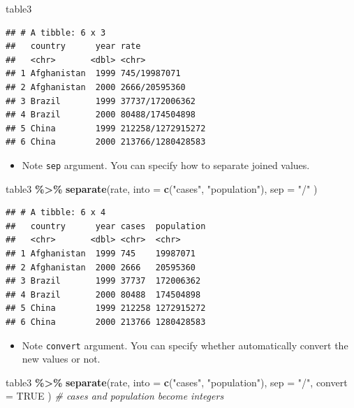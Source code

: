 \documentclass[
]{book}
\newenvironment{Shaded}{\begin{snugshade}}{\end{snugshade}}
\newcommand{\AttributeTok}[1]{\textcolor[rgb]{0.13,0.29,0.53}{#1}}
\newcommand{\CommentTok}[1]{\textcolor[rgb]{0.56,0.35,0.01}{\textit{#1}}}
\newcommand{\ConstantTok}[1]{\textcolor[rgb]{0.56,0.35,0.01}{#1}}
\newcommand{\FunctionTok}[1]{\textcolor[rgb]{0.13,0.29,0.53}{\textbf{#1}}}
\newcommand{\NormalTok}[1]{#1}
\newcommand{\SpecialCharTok}[1]{\textcolor[rgb]{0.81,0.36,0.00}{\textbf{#1}}}
\newcommand{\StringTok}[1]{\textcolor[rgb]{0.31,0.60,0.02}{#1}}
\providecommand{\tightlist}{%
  \setlength{\itemsep}{0pt}\setlength{\parskip}{0pt}}
\begin{document}
\begin{Shaded}
\begin{Highlighting}[]
\NormalTok{table3}
\end{Highlighting}
\end{Shaded}

\begin{verbatim}
## # A tibble: 6 x 3
##   country      year rate             
##   <chr>       <dbl> <chr>            
## 1 Afghanistan  1999 745/19987071     
## 2 Afghanistan  2000 2666/20595360    
## 3 Brazil       1999 37737/172006362  
## 4 Brazil       2000 80488/174504898  
## 5 China        1999 212258/1272915272
## 6 China        2000 213766/1280428583
\end{verbatim}

\begin{itemize}
\tightlist
\item
  Note \texttt{sep} argument. You can specify how to separate joined values.
\end{itemize}

\begin{Shaded}
\begin{Highlighting}[]
\NormalTok{table3 }\SpecialCharTok{\%\textgreater{}\%}
  \FunctionTok{separate}\NormalTok{(rate,}
    \AttributeTok{into =} \FunctionTok{c}\NormalTok{(}\StringTok{"cases"}\NormalTok{, }\StringTok{"population"}\NormalTok{),}
    \AttributeTok{sep =} \StringTok{"/"}
\NormalTok{  )}
\end{Highlighting}
\end{Shaded}

\begin{verbatim}
## # A tibble: 6 x 4
##   country      year cases  population
##   <chr>       <dbl> <chr>  <chr>     
## 1 Afghanistan  1999 745    19987071  
## 2 Afghanistan  2000 2666   20595360  
## 3 Brazil       1999 37737  172006362 
## 4 Brazil       2000 80488  174504898 
## 5 China        1999 212258 1272915272
## 6 China        2000 213766 1280428583
\end{verbatim}

\begin{itemize}
\tightlist
\item
  Note \texttt{convert} argument. You can specify whether automatically convert the new values or not.
\end{itemize}

\begin{Shaded}
\begin{Highlighting}[]
\NormalTok{table3 }\SpecialCharTok{\%\textgreater{}\%}
  \FunctionTok{separate}\NormalTok{(rate,}
    \AttributeTok{into =} \FunctionTok{c}\NormalTok{(}\StringTok{"cases"}\NormalTok{, }\StringTok{"population"}\NormalTok{),}
    \AttributeTok{sep =} \StringTok{"/"}\NormalTok{,}
    \AttributeTok{convert =} \ConstantTok{TRUE}
\NormalTok{  ) }\CommentTok{\# cases and population become integers}
\end{Highlighting}
\end{Shaded}
\end{document}

